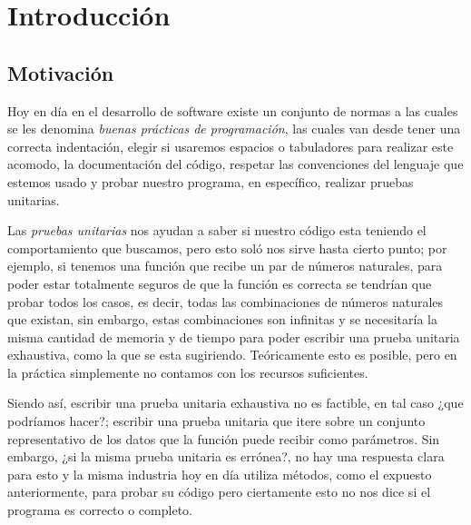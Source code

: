 \chapter{Introducción}

\section{Motivación}
\label{motivation}
Hoy en día en el desarrollo de software existe un conjunto de normas a las cuales se les denomina
\textit{buenas pr\'acticas de programaci\'on}, las cuales van desde tener una correcta
indentaci\'on, elegir si usaremos espacios o tabuladores para realizar este acomodo, la
documentaci\'on del c\'odigo, respetar las convenciones del lenguaje que estemos usado y probar
nuestro programa, en espec\'ifico, realizar pruebas unitarias.

Las \textit{pruebas unitarias} nos ayudan a saber si nuestro código esta teniendo el comportamiento
que buscamos, pero esto sol\'o nos sirve hasta cierto punto; por ejemplo, si tenemos una funci\'on
que recibe un par de números naturales, para poder estar totalmente seguros de que la funci\'on es
correcta se tendrían que probar todos los casos, es decir, todas las combinaciones de números
naturales que existan, sin embargo, estas combinaciones son infinitas y se necesitaría la misma
cantidad de memoria y de tiempo para poder escribir una prueba unitaria exhaustiva, como la que se
esta sugiriendo. Teóricamente esto es posible, pero en la pr\'actica simplemente no contamos con los recursos suficientes.

Siendo as\'i, escribir una prueba unitaria exhaustiva no es factible, en tal caso ¿que podríamos
hacer?; escribir una prueba unitaria que itere sobre un conjunto representativo de los datos que la
funci\'on puede recibir como par\'ametros. Sin embargo, ¿si la misma prueba unitaria es errónea?,
no hay una respuesta clara para esto y la misma industria hoy en día utiliza métodos, como el
expuesto anteriormente, para probar su c\'odigo pero ciertamente esto no nos dice si el programa es
correcto o completo.

